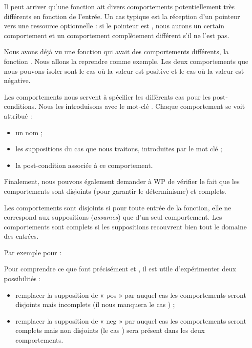 Il peut arriver qu'une fonction ait divers comportements potentiellement très
différents en fonction de l'entrée. Un cas typique est la réception d'un 
pointeur vers une ressource optionnelle : si le pointeur est , nous 
aurons un certain comportement et un comportement complètement différent s'il ne 
l'est pas.



Nous avons déjà vu une fonction qui avait des comportements différents, la 
fonction . Nous allons la reprendre comme exemple. Les deux 
comportements que nous pouvons isoler sont le cas où la valeur est positive et
le cas où la valeur est négative.



Les comportements nous servent à spécifier les différents cas pour les 
post-conditions. Nous les introduisons avec le mot-clé . 
Chaque comportement se voit attribué :



\begin{itemize}
\item un nom ;
\item les suppositions du cas que nous traitons, introduites par le mot 
clé  ;
\item la post-condition associée à ce comportement.
\end{itemize}


Finalement, nous pouvons également demander à WP
de vérifier le fait que les comportements sont disjoints (pour garantir 
le déterminisme) et complets.



Les comportements sont disjoints si pour toute entrée de la fonction, elle ne
correspond aux suppositions (\textit{assumes}) que d'un seul comportement. Les 
comportements sont complets si les suppositions recouvrent bien tout le domaine
des entrées.



Par exemple pour  :






Pour comprendre ce que font précisément  et , il est utile
d'expérimenter deux possibilités :



\begin{itemize}
\item remplacer la supposition de « pos » par  auquel cas les 
comportements seront disjoints mais incomplets (il nous manquera le cas 
) ;
\item remplacer la supposition de « neg » par  auquel cas les 
comportements seront complets mais non disjoints (le cas ) sera
présent dans les deux comportements.
\end{itemize}


